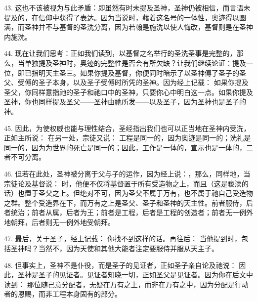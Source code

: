 43. 这也不该被视为与此矛盾：即虽然有时未提及圣神，圣神仍被相信，而言语未提及的，在信仰中获得了表达。因为当说时，藉着这名号的一体性，奥迹得以圆满，而圣神并不与基督的圣洗分离，因为若翰是施洗以使人悔改，基督则是在圣神内施洗。\par

44. 现在让我们思考：正如我们读到，以基督之名举行的圣洗圣事是完整的，那么，当单独提及圣神时，奥迹的完整性是否会有所欠缺？让我们继续论证：提及一位，即已指明天主圣三。如果你提及基督，你便同时暗示了以圣神傅了圣子的圣父、受傅的圣子本身，以及圣子受傅时所凭的圣神。因为经上记载： 如果你提及圣父，你同样意指祂的圣子和祂口中的圣神，只要你心中明白这一点。如果你提及圣神，你也同样提及圣父——圣神由祂所发——以及圣子，因为圣神也是圣子的神。\par

45. 因此，为使权威也能与理性结合，圣经指出我们也可以正当地在圣神内受洗，正如主所说： 在另一处，宗徒又说： 工程是同一的，因为奥迹是同一的；洗礼是同一的，因为为世界的死亡是同一的；因此，工作是一体的，宣示也是一体的，二者不可分离。\par

46. 但若在此处，圣神被分离于父与子的运作，因为经上说：，那么，同样地，当宗徒论及基督说： 时，他便不仅将基督置于所有受造物之上，而且（这是亵渎的话）也置于圣父之上。但绝对不可，因为圣父不属于万有，也不属于祂自己受造物之群。整个受造界在下，而万有之上是圣父、圣子和圣神的天主性。前者服侍，后者统治；前者从属，后者为王；前者是工程，后者是工程的创造者；前者无一例外地朝拜，后者则无一例外地受朝拜。\par

47. 最后，关于圣子，经上记载： 你找不到这样的话。再往后： 当他提到时，包括圣神吗？当然不，因为天使和其他大能者注定要服侍并服从天主子。\par

48. 但事实上，圣神不是仆役，而是圣子的见证者，正如圣子亲自论及祂说： 因此，圣神是圣子的见证者。见证者知晓一切，正如圣父是见证者。因为你在后文中读到： 那位随己意分配者，无疑在万有之上，而非在万有之中，因为分配是行动者的恩赐，而非工程本身固有的部分。\par


